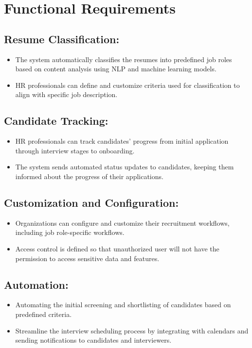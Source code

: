 \section{Functional Requirements}

\subsection{Resume Classification:} 
\begin{itemize}
	\item The system automatically classifies the resumes into predefined job roles based on content analysis using NLP and machine learning models.
	\item HR professionals can define and customize criteria used for classification to align with specific job description.
\end{itemize}

\subsection{Candidate Tracking:}
\begin{itemize}
	\item  HR professionals can track candidates' progress from initial application through interview stages to onboarding.
	\item The system sends automated status updates to candidates, keeping them informed about the progress of their applications.
\end{itemize}

\subsection{Customization and Configuration:}
\begin{itemize}
	\item Organizations can configure and customize their recruitment workflows, including job role-specific workflows.
	\item Access control is defined so that unauthorized user will not have the permission to access sensitive data and features.
\end{itemize}

\subsection{Automation:}
\begin{itemize}
	\item Automating the initial screening and shortlisting of candidates based on predefined criteria.
	\item Streamline the interview scheduling process by integrating with calendars and sending notifications to candidates and interviewers.
\end{itemize}

